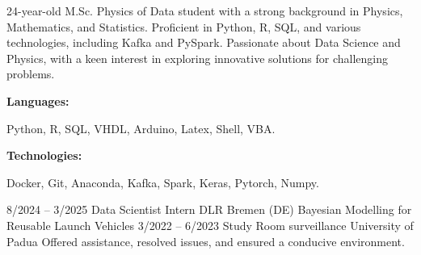 \documentclass[9pt]{developercv} %
\begin{document}
\begin{minipage}[t]{0.46\textwidth}
	\vspace{-6pt}
 
	24-year-old M.Sc. Physics of Data student with a strong background in Physics, Mathematics, and Statistics. Proficient in Python, R, SQL, and various technologies, including Kafka and PySpark. Passionate about Data Science and Physics, with a keen interest in exploring innovative solutions for challenging problems.\\
 
\end{minipage}
\hfill %
\begin{minipage}[t]{0.465\textwidth}
    \vspace{-6pt}
    
    \begin{minipage}[t]{0.2\textwidth}
        \textbf{Languages:}
    \end{minipage}
    \hfill
    \begin{minipage}[t]{0.73\textwidth}
      Python, R, SQL, VHDL, Arduino, Latex, Shell, VBA.  
    \end{minipage}
    \vspace{4mm}
    
    \begin{minipage}[t]{0.2\textwidth}
        \textbf{Technologies:}
    \end{minipage}
    \hfill
    \begin{minipage}[t]{0.73\textwidth}
      Docker, Git, Anaconda, Kafka, Spark, Keras, Pytorch, Numpy.
    \end{minipage}
    
\end{minipage}


\vspace{-10 pt}
\begin{entrylist}
	\entry
        {8/2024 -- 3/2025}
		{Data Scientist Intern}
		{DLR Bremen (DE)}
            {Bayesian Modelling for Reusable Launch Vehicles}
	\entry
        {3/2022 -- 6/2023}
		{Study Room surveillance}
		{University of Padua}
            {Offered assistance, resolved issues, and ensured a conducive environment.}
		
\end{entrylist}
\end{document}
